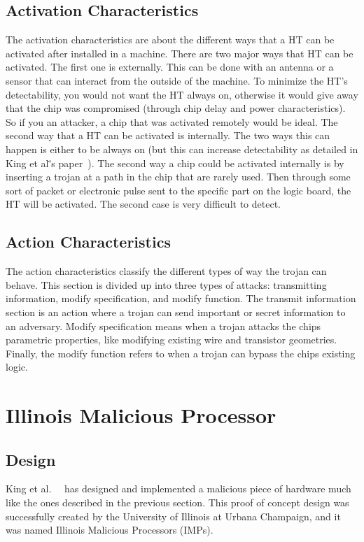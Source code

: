 \documentclass[letterpaper,twocolumn,11pt]{article}
\begin{document}
\subsection{Activation Characteristics}
The activation characteristics are about the different ways that a HT can be activated after installed in a machine. There are two major ways that HT can be activated. The first one is externally. This can be done with an antenna or a sensor that can interact from the outside of the machine. To minimize the HT's detectability, you would not want the HT always on, otherwise it would give away that the chip was compromised (through chip delay and power characteristics). So if you an attacker, a chip that was activated remotely would be ideal. The second way that a HT can be activated is internally. The two ways this can happen is either to be always on (but this can increase detectability as detailed in King et al\.'s paper~\cite {king}). The second way a chip could be activated internally is by inserting a trojan at a path in the chip that are rarely used. Then through some sort of packet or electronic pulse sent to the specific part on the logic board, the HT will be activated. The second case is very difficult to detect.

\subsection{Action Characteristics}
The action characteristics classify the different types of way the trojan can behave. This section is divided up into three types of attacks: transmitting information, modify specification, and modify function. The transmit information section is an action where a trojan can send important or secret information to an adversary. Modify specification means when a trojan attacks the chips parametric properties, like modifying existing wire and transistor geometries. Finally, the modify function refers to when a trojan can bypass the chips existing logic.

\section{Illinois Malicious Processor}
\subsection{Design}
King et al.\ ~\cite {king} has designed and implemented a malicious piece of hardware much like the ones described in the previous section. This proof of concept design was successfully created by the University of Illinois at Urbana Champaign, and it was named Illinois Malicious Processors (IMPs). 
\end{document}
